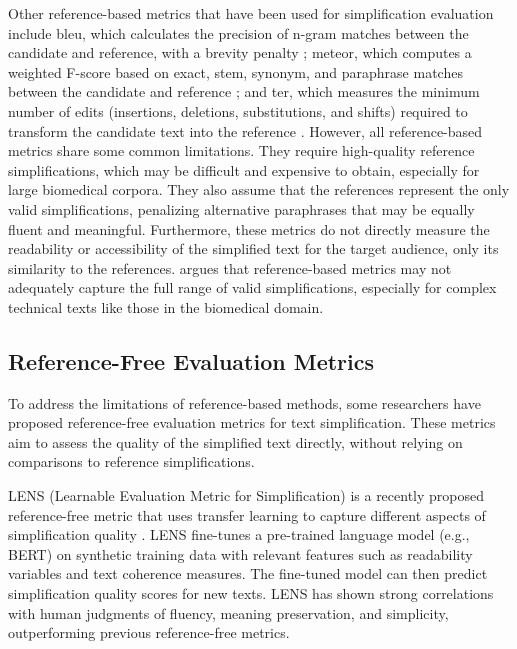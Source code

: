 Other reference-based metrics that have been used for simplification evaluation include \gls{bleu}, which calculates the precision of n-gram matches between the candidate and reference, with a brevity penalty \cite{papineni-etal-2002-bleu}; \gls{meteor}, which computes a weighted F-score based on exact, stem, synonym, and paraphrase matches between the candidate and reference \cite{banerjee-lavie-2005-meteor}; and \gls{ter}, which measures the minimum number of edits (insertions, deletions, substitutions, and shifts) required to transform the candidate text into the reference \cite{snover-etal-2006-study}.
However, all reference-based metrics share some common limitations. 
They require high-quality reference simplifications, which may be difficult and expensive to obtain, especially for large biomedical corpora. 
They also assume that the references represent the only valid simplifications, penalizing alternative paraphrases that may be equally fluent and meaningful. 
Furthermore, these metrics do not directly measure the readability or accessibility of the simplified text for the target audience, only its similarity to the references. 
\cite{sottana2023evaluationmetricseragpt4, huang-kochmar-2024-referee, lyu2024scigispynovelmetricbiomedical} argues that reference-based metrics may not adequately capture the full range of valid simplifications, especially for complex technical texts like those in the biomedical domain.

\subsection{Reference-Free Evaluation Metrics}

To address the limitations of reference-based methods, some researchers have proposed reference-free evaluation metrics for text simplification. These metrics aim to assess the quality of the simplified text directly, without relying on comparisons to reference simplifications.

LENS (Learnable Evaluation Metric for Simplification) is a recently proposed reference-free metric that uses transfer learning to capture different aspects of simplification quality \cite{maddela-etal-2023-lens}. LENS fine-tunes a pre-trained language model (e.g., BERT) on synthetic training data with relevant features such as readability variables and text coherence measures. The fine-tuned model can then predict simplification quality scores for new texts. LENS has shown strong correlations with human judgments of fluency, meaning preservation, and simplicity, outperforming previous reference-free metrics.

